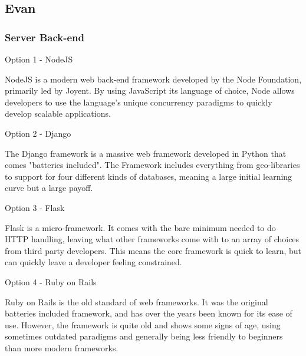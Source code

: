 \documentclass[letterpaper, 10pt, draftclsnofoot, compsoc, onecolumn]{IEEEtran}
\begin{document}
{%
\newpage
\subsection{Evan}
\vspace{1pc}
\subsubsection{Server Back-end}
{\noindent Option 1 - NodeJS \par}
{\noindent NodeJS is a modern web back-end framework developed by the Node Foundation,
primarily led by Joyent. By using JavaScript its language of choice, Node allows
developers to use the language's unique concurrency paradigms to quickly develop
scalable applications. \par}
{\noindent Option 2 - Django \par}
{\noindent The Django framework is a massive web framework developed in Python that comes "batteries
included". The Framework includes everything from geo-libraries to support for four different kinds of
databases, meaning a large initial learning curve but a large payoff. \par}
{\noindent Option 3 - Flask \par}
{\noindent Flask is a micro-framework. It comes with the bare minimum needed to do HTTP handling, leaving
what other frameworks come with to an array of choices from third party developers. This means the core
framework is quick to learn, but can quickly leave a developer feeling constrained. \par}
{\noindent Option 4 - Ruby on Rails \par}
{\noindent Ruby on Rails is the old standard of web frameworks. It was the original batteries included
framework, and has over the years been known for its ease of use. However, the framework is quite old
and shows some signs of age, using sometimes outdated paradigms and generally being less friendly to beginners
than more modern frameworks. \par}

}
\end{document}
